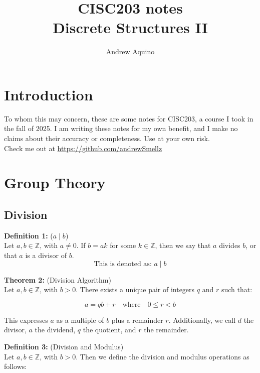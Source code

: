 \documentclass[12pt]{article}
\title{CISC203 notes\\Discrete Structures II}
\author{Andrew Aquino}
\date{}
\begin{document}
\maketitle

\section*{Introduction}

To whom this may concern, these are some notes for CISC203, 
a course I took in the fall of 2025. 
I am writing these notes for my own benefit, 
and I make no claims about their accuracy or completeness. 
Use at your own risk.\\

Check me out at \url{https://github.com/andrewSmellz}

\tableofcontents
\newpage

\section{Group Theory}

\subsection{Division}

\noindent\textbf{Definition 1:} ($a \mid b$) 
\label{def:divides}
\\Let $a, b \in \mathbb{Z}$, with $a \neq 0$.  
If $b = ak$ for some $k \in \mathbb{Z}$, then we say that $a$ divides $b$,  
or that $a$ is a divisor of $b$. 
\[\text{This is denoted as: } a \mid b\]

\vspace{5mm}

\noindent\textbf{Theorem 2:} (Division Algorithm) 
\label{thm:division}
\\Let $a, b \in \mathbb{Z}$, with $b > 0$.  
There exists a unique pair of integers $q$ and $r$ such that:

\[
a = qb + r \quad \text{where} \quad 0 \leq r < b
\]

\noindent This expresses $a$ as a multiple of $b$ plus a remainder $r$.
Additionally, we call $d$ the divisor, $a$ the dividend, $q$ the quotient, and $r$ the remainder.

\vspace{5mm}

\noindent\textbf{Definition 3:} (Division and Modulus)
\label{def:divmod}
\\Let $a, b \in \mathbb{Z}$, with $b > 0$. 
Then we define the division and modulus operations as follows:
\end{document}
